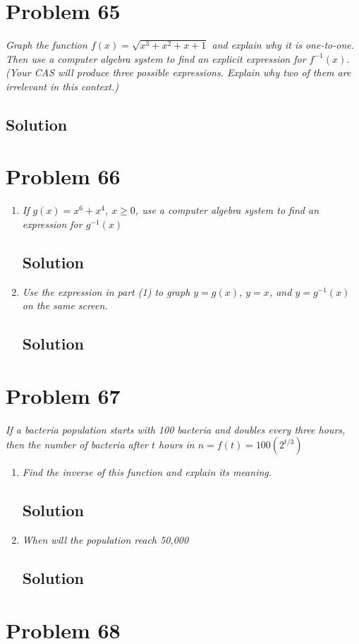 \documentclass[11pt]{article}
\newcommand{\soln}{\subsection*}
\newcommand{\qn}{\textit}
\begin{document}
\section*{Problem 65}

\qn{Graph the function $f(x)=\sqrt{x^3+x^2+x+1}$ and explain why it is one-to-one. Then use a computer algebra system to find an explicit expression for $f^{-1}(x)$. (Your CAS will produce three possible expressions. Explain why two of them are irrelevant in this context.)}

\soln{Solution}

\section*{Problem 66}

\begin{enumerate}
	\item \qn{If $g(x)=x^6+x^4$, $x \ge 0$, use a computer algebra system to find an expression for $g^{-1}(x)$}
	\soln{Solution}
	
	\item \qn{Use the expression in part (1) to graph $y=g(x)$, $y=x$, and $y=g^{-1}(x)$ on the same screen.}
	\soln{Solution}
\end{enumerate}

\section*{Problem 67}

\qn{If a bacteria population starts with 100 bacteria and doubles every three hours, then the number of bacteria after $t$ hours in $n=f(t)=100(2^{t/3})$}
\begin{enumerate}
	\item \qn{Find the inverse of this function and explain its meaning.}
	\soln{Solution}
	
	\item \qn{When will the population reach 50,000}
	\soln{Solution}
\end{enumerate}

\section*{Problem 68}
\end{document}
